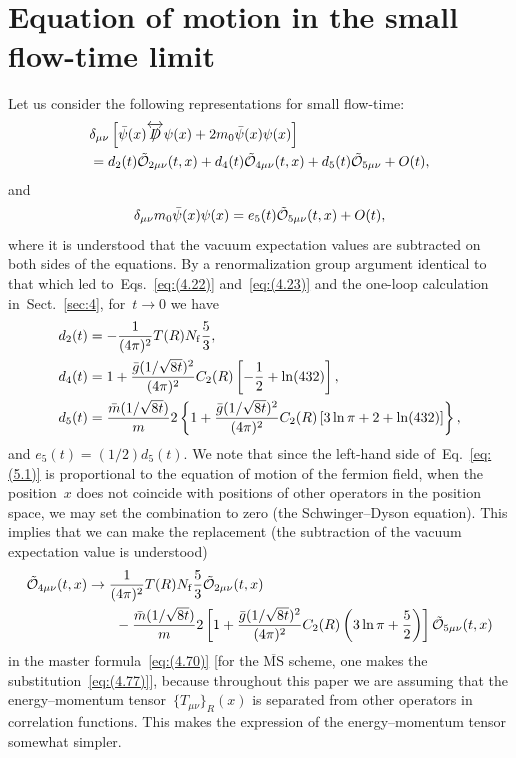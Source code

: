 \section{Equation of motion in the small flow-time limit}
\label{sec:5}
Let us consider the following representations for small flow-time:
\begin{align}
   &\delta_{\mu\nu}\left[\Bar{\psi}(x)\overleftrightarrow{\Slash{D}}\psi(x)
   +2m_0\Bar{\psi}(x)\psi(x)\right]
\notag\\
   &=d_2(t)\Tilde{\mathcal{O}}_{2\mu\nu}(t,x)
   +d_4(t)\Tilde{\mathcal{O}}_{4\mu\nu}(t,x)
   +d_5(t)\Tilde{\mathcal{O}}_{5\mu\nu}+O(t),
\label{eq:(5.1)}
\end{align}
and
\begin{equation}
   \delta_{\mu\nu}m_0\Bar{\psi}(x)\psi(x)
   =e_5(t)\Tilde{\mathcal{O}}_{5\mu\nu}(t,x)+O(t),
\label{eq:(5.2)}
\end{equation}
where it is understood that the vacuum expectation values are subtracted on
both sides of the equations. By a renormalization group argument identical to
that which led to~Eqs.~\eqref{eq:(4.22)} and~\eqref{eq:(4.23)} and the one-loop
calculation in~Sect.~\ref{sec:4}, for~$t\to0$ we have
\begin{align}
   d_2(t)&=-\frac{1}{(4\pi)^2}T(R)N_{\mathrm{f}}\frac{5}{3},
\label{eq:(5.3)}\\
   d_4(t)&=1+\frac{\Bar{g}(1/\sqrt{8t})^2}{(4\pi)^2}C_2(R)
   \left[-\frac{1}{2}+\ln(432)\right],
\label{eq:(5.4)}\\
   d_5(t)&=\frac{\Bar{m}(1/\sqrt{8t})}{m}
   2\left\{1+\frac{\Bar{g}(1/\sqrt{8t})^2}{(4\pi)^2}C_2(R)
   \left[3\ln\pi+2+\ln(432)\right]\right\},
\label{eq:(5.5)}
\end{align}
and $e_5(t)=(1/2)d_5(t)$. We note that since the left-hand side
of~Eq.~\eqref{eq:(5.1)} is proportional to the equation of motion of the
fermion field, when the position~$x$ does not coincide with positions of other
operators in the position space, we may set the combination to zero (the
Schwinger--Dyson equation). This implies that we can make the replacement (the
subtraction of the vacuum expectation value is understood)
\begin{align}
   \Tilde{\mathcal{O}}_{4\mu\nu}(t,x)
   &\to\frac{1}{(4\pi)^2}T(R)N_{\mathrm{f}}\frac{5}{3}
   \Tilde{\mathcal{O}}_{2\mu\nu}(t,x)
\notag\\
   &\qquad{}
   -\frac{\Bar{m}(1/\sqrt{8t})}{m}2
   \left[1+\frac{\Bar{g}(1/\sqrt{8t})^2}{(4\pi)^2}C_2(R)
   \left(3\ln\pi+\frac{5}{2}\right)\right]\Tilde{\mathcal{O}}_{5\mu\nu}(t,x)
\label{eq:(5.6)}
\end{align}
in the master formula~\eqref{eq:(4.70)} [for the $\overline{\text{MS}}$ scheme,
one makes the substitution~\eqref{eq:(4.77)}], because throughout this paper we
are assuming that the energy--momentum tensor~$\{T_{\mu\nu}\}_R(x)$ is separated
from other operators in correlation functions. This makes the expression of the
energy--momentum tensor somewhat simpler.

